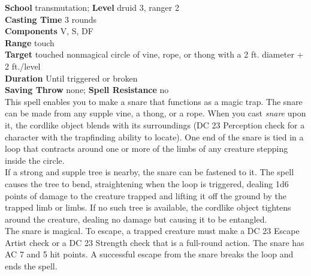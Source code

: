 \textbf{School} transmutation; \textbf{Level} druid 3, ranger 2\\
\textbf{Casting Time} 3 rounds\\
\textbf{Components} V, S, DF\\
\textbf{Range} touch\\
\textbf{Target} touched nonmagical circle of vine, rope, or thong with a 2 ft. diameter + 2 ft./level\\
\textbf{Duration} Until triggered or broken\\
\textbf{Saving Throw} none; \textbf{Spell Resistance} no\\
This spell enables you to make a snare that functions as a magic trap. The snare can be made from any supple vine, a thong, or a rope. When you cast \textit{snare }upon it, the cordlike object blends with its surroundings (DC 23 Perception check for a character with the trapfinding ability to locate). One end of the snare is tied in a loop that contracts around one or more of the limbs of any creature stepping inside the circle.\\
If a strong and supple tree is nearby, the snare can be fastened to it. The spell causes the tree to bend, straightening when the loop is triggered, dealing 1d6 points of damage to the creature trapped and lifting it off the ground by the trapped limb or limbs. If no such tree is available, the cordlike object tightens around the creature, dealing no damage but causing it to be entangled.\\
The snare is magical. To escape, a trapped creature must make a DC 23 Escape Artist check or a DC 23 Strength check that is a full-round action. The snare has AC 7 and 5 hit points. A successful escape from the snare breaks the loop and ends the spell.\\
